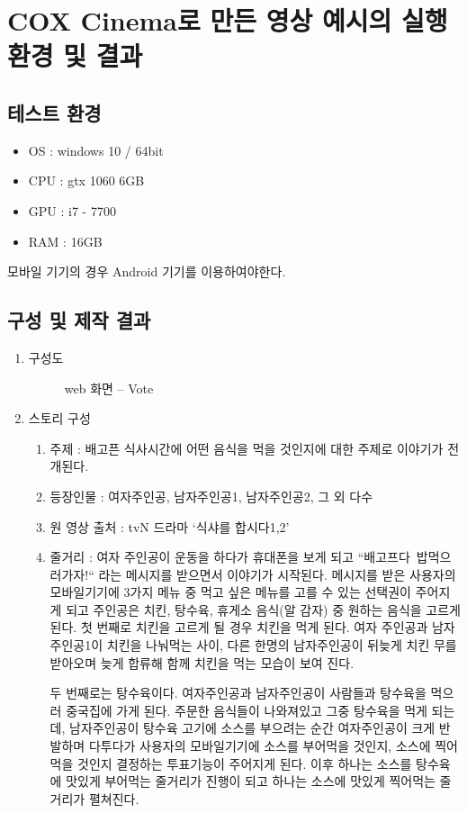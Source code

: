 \documentclass[chapter,oneside]{oblivoir}
\newcommand{\spec}{
    \begin{itemize}
        \item OS : windows 10 / 64bit
        \item CPU : gtx 1060 6GB
        \item GPU : i7 - 7700
        \item RAM : 16GB
    \end{itemize}
    }
\begin{document}
\newpage

\section{ COX Cinema로 만든 영상 예시의 실행환경 및 결과 }

\subsection{테스트 환경 }
\spec
모바일 기기의 경우 Android 기기를 이용하여야한다.

\subsection{ 구성 및 제작 결과}

\begin{enumerate}

\item 구성도

\begin{figure}[h!]
\centering
\caption{web 화면 – Vote}
\end{figure} 

\item 스토리 구성

    \begin{enumerate}%

        \item 주제 : 배고픈 식사시간에 어떤 음식을 먹을 것인지에 대한 주제로 이야기가 전개된다.  
        \item 등장인물 : 여자주인공, 남자주인공1, 남자주인공2, 그 외 다수
        \item 원 영상 출처 : tvN 드라마 ‘식샤를 합시다1,2’ 

        \item 줄거리 : 여자 주인공이 운동을 하다가 휴대폰을 보게 되고 “배고프다~밥먹으러가자!“ 라는 메시지를 받으면서 이야기가 시작된다. 메시지를 받은 사용자의 모바일기기에 3가지 메뉴 중 먹고 싶은 메뉴를 고를 수 있는 선택권이 주어지게 되고 주인공은 치킨, 탕수육, 휴게소 음식(알 감자) 중 원하는 음식을 고르게 된다. 첫 번째로 치킨을 고르게 될 경우 치킨을 먹게 된다. 여자 주인공과 남자주인공1이 치킨을 나눠먹는 사이, 다른 한명의 남자주인공이 뒤늦게 치킨 무를 받아오며 늦게 합류해 함께 치킨을 먹는 모습이 보여 진다. 

    두 번째로는 탕수육이다. 여자주인공과 남자주인공이 사람들과 탕수육을 먹으러 중국집에 가게 된다. 주문한 음식들이 나와져있고 그중 탕수육을 먹게 되는데, 남자주인공이 탕수육 고기에 소스를 부으려는 순간 여자주인공이 크게 반발하며 다투다가 사용자의 모바일기기에 소스를 부어먹을 것인지, 소스에 찍어먹을 것인지 결정하는 투표기능이 주어지게 된다. 이후 하나는 소스를 탕수육에 맛있게 부어먹는 줄거리가 진행이 되고 하나는 소스에 맛있게 찍어먹는 줄거리가 펼쳐진다. 


\end{enumerate}
\end{enumerate}
\end{document}
